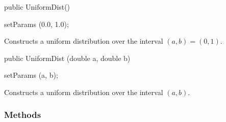 \begin{code}

   public UniformDist()\begin{hide} {
      setParams (0.0, 1.0);
   }\end{hide}
\end{code} 
  \begin{tabb} Constructs a uniform distribution over the interval $(a,b) = (0,1)$.
  \end{tabb}
\begin{code}   

   public UniformDist (double a, double b)\begin{hide} {
      setParams (a, b);
   }\end{hide}
\end{code}
  \begin{tabb} Constructs a uniform distribution over the interval $(a,b)$.
  \end{tabb}


\subsubsection* {Methods}

